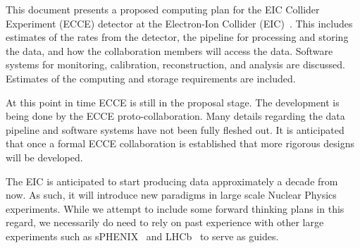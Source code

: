 

This document presents a proposed computing plan for the EIC Collider Experiment (ECCE) detector at the Electron-Ion Collider (EIC)~\cite{eic_yellow_report_v1_1}. This includes estimates of the rates from the detector, the pipeline for processing and storing the data, and how the collaboration members will access the data. Software systems for monitoring, calibration, reconstruction, and analysis are discussed. Estimates of the computing and storage requirements are included.

At this point in time ECCE is still in the proposal stage. The development is being done by the ECCE proto-collaboration. Many details regarding the data pipeline and software systems have not been fully fleshed out. It is anticipated that once a formal ECCE collaboration is established that more rigorous designs will be developed. 

The EIC is anticipated to start producing data approximately a decade from now. As such, it will introduce new paradigms in large scale Nuclear Physics experiments. While we attempt to include some forward thinking plans in this regard, we necessarily do need to rely on past experience with other large experiments such as sPHENIX~\cite{sphenix_computing_plan_2019} and LHCb~\cite{CAMPORAPEREZ2016280} to serve as guides.